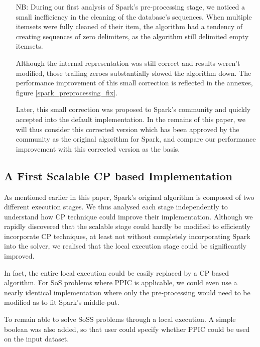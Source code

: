 \documentclass{eplmastersthesis}
\begin{document}
\begin{itemize}
  \item[NB:] During our first analysis of Spark's pre-processing stage, we noticed a small inefficiency in the cleaning of the database's sequences. When multiple itemsets were fully cleaned of their item, the algorithm had a tendency of creating sequences of zero delimiters, as the algorithm still delimited empty itemsets.

Although the internal representation was still correct and results weren't modified, those trailing zeroes substantially slowed the algorithm down.
The performance improvement of this small correction is reflected in the annexes, figure \ref{spark_preprocessing_fix}.

Later, this small correction was proposed to Spark's community and quickly accepted into the default implementation. In the remains of this paper, we will thus consider this corrected version which has been approved by the community as the original algorithm for Spark, and compare our performance improvement with this corrected version as the basis.
\end{itemize}

\subsection{A First Scalable CP based Implementation}

As mentioned earlier in this paper, Spark's original algorithm is composed of two different execution stages. We thus analysed each stage independently to understand how CP technique could improve their implementation. Although we rapidly discovered that the scalable stage could hardly be modified to efficiently incorporate CP techniques, at least not without completely incorporating Spark into the solver, we realised that the local execution stage could be significantly improved. \newline

In fact, the entire local execution could be easily replaced by a CP based algorithm. For \acrshort{SoS} problems where PPIC is applicable, we could even use a nearly identical implementation where only the pre-processing would need to be modified as to fit Spark's middle-put. \newline

To remain able to solve \acrshort{SoSS} problems through a local execution. A simple boolean was also added, so that user could specify whether PPIC could be used on the input dataset. \newline
\end{document}
